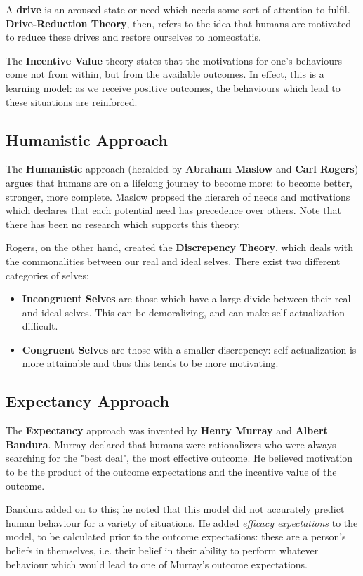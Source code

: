 \documentclass[12pt]{article}
\begin{document}
A {\bf drive} is an aroused state or need which needs some sort of attention to fulfil. {\bf Drive-Reduction Theory}, then, refers to the idea that humans are motivated to reduce these drives and restore ourselves to homeostatis.

The {\bf Incentive Value} theory states that the motivations for one's behaviours come not from within, but from the available outcomes. In effect, this is a learning model: as we receive positive outcomes, the behaviours which lead to these situations are reinforced.

\subsection*{Humanistic Approach}
The {\bf Humanistic} approach (heralded by {\bf Abraham Maslow} and {\bf Carl Rogers}) argues that humans are on a lifelong journey to become more: to become better, stronger, more complete. Maslow propsed the hierarch of needs and motivations which declares that each potential need has precedence over others. Note that there has been no research which supports this theory.

Rogers, on the other hand, created the {\bf Discrepency Theory}, which deals with the commonalities between our real and ideal selves. There exist two different categories of selves:
\begin{itemize}
\item {\bf Incongruent Selves} are those which have a large divide between their real and ideal selves. This can be demoralizing, and can make self-actualization difficult.
\item {\bf Congruent Selves} are those with a smaller discrepency: self-actualization is more attainable and thus this tends to be more motivating.
\end{itemize}

\subsection*{Expectancy Approach}
The {\bf Expectancy} approach was invented by {\bf Henry Murray} and {\bf Albert Bandura}. Murray declared that humans were rationalizers who were always searching for the "best deal", the most effective outcome. He believed motivation to be the product of the outcome expectations and the incentive value of the outcome.

Bandura added on to this; he noted that this model did not accurately predict human behaviour for a variety of situations. He added {\it efficacy expectations} to the model, to be calculated prior to the outcome expectations: these are a person's beliefs in themselves, i.e. their belief in their ability to perform whatever behaviour which would lead to one of Murray's outcome expectations.
\end{document}
